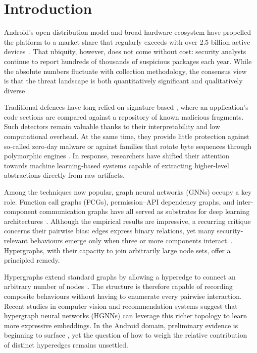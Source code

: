 \documentclass[runningheads]{llncs}
\begin{document}
\section{Introduction}
Android's open distribution model and broad hardware ecosystem have propelled the platform to a market share that regularly exceeds with over 2.5 billion active devices~\cite{google2025androidshow}.
That ubiquity, however, does not come without cost: security analysts continue to report hundreds of thousands of suspicious packages each year. While the absolute numbers fluctuate with collection methodology, the consensus view is that the threat landscape is both quantitatively significant and qualitatively diverse \cite{arora2020}.

Traditional defences have long relied on signature‐based \cite{moser2007}, where an application's code sections are compared against a repository of known malicious fragments. Such detectors remain valuable thanks to their interpretability and low computational overhead. At the same time, they provide little protection against so‐called zero‑day malware or against families that rotate byte sequences through polymorphic engines \cite{you2010}. In response, researchers have shifted their attention towards machine learning‑based systems capable of extracting higher‑level abstractions directly from raw artifacts.

Among the techniques now popular, graph neural networks (GNNs) occupy a key role. Function call graphs (FCGs), permission–API dependency graphs, and inter‐component communication graphs have all served as substrates for deep learning architectures~\cite{bilot2024}. Although the empirical results are impressive, a recurring critique concerns their pairwise bias: edges express binary relations, yet many security‐relevant behaviours emerge only when three or more components interact~\cite{gascon2013structural,arp2014}. Hypergraphs, with their capacity to join arbitrarily large node sets, offer a principled remedy.

Hypergraphs extend standard graphs by allowing a hyperedge to connect an arbitrary number of nodes~\cite{feng2019}. The structure is therefore capable of recording composite behaviours without having to enumerate every pairwise interaction. Recent studies in computer vision and recommendation systems suggest that hypergraph neural networks (HGNNs) \cite{feng2019,gao2023} can leverage this richer topology to learn more expressive embeddings. In the Android domain, preliminary evidence is beginning to surface \cite{zhang2023}, yet the question of how to weigh the relative contribution of distinct hyperedges remains unsettled.
\end{document}
